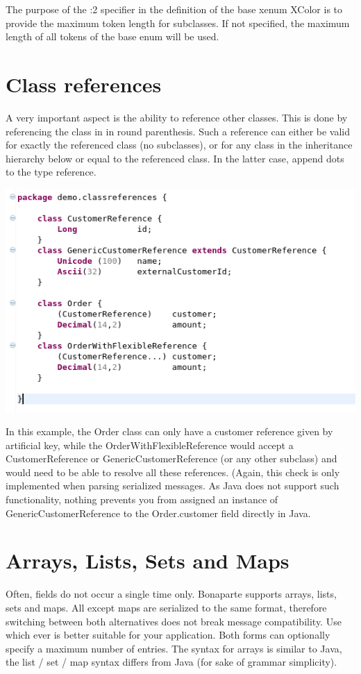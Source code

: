 \documentclass[11pt,a4paper,oneside]{article}
\begin{document}
The purpose of the {\ttfamily :2} specifier in the definition of the base xenum {\ttfamily XColor} is to provide the maximum
token length for subclasses. If not specified, the maximum length of all tokens of the base enum will be used.


\section{Class references}
A very important aspect is the ability to reference other classes. This is done by referencing the class in in round parenthesis.
Such a reference can either be valid for exactly the referenced class (no subclasses), or for any class in the inheritance hierarchy below or equal to
 the referenced class. In the latter case, append dots to the type reference.

\vspace{2mm}

\hspace{1cm}\includegraphics[scale=0.5]{images/tut1-014-ref.png}

\noindent In this example, the {\ttfamily Order} class can only have a customer reference given by artificial key, while the {\ttfamily OrderWithFlexibleReference}
would accept a {\ttfamily CustomerReference} or {\ttfamily GenericCustomerReference} (or any other subclass) and would need to be able to resolve all these
references. (Again, this check is only implemented when parsing serialized messages. As Java does not support such functionality, nothing prevents you
from assigned an instance of {\ttfamily GenericCustomerReference}  to the {\ttfamily Order.customer} field directly in Java.



\section{Arrays, Lists, Sets and Maps}
Often, fields do not occur a single time only. Bonaparte supports arrays, lists, sets and maps. All except maps are
serialized to the same format, therefore switching between both alternatives does not break message compatibility.
Use which ever is better suitable for your application.
Both forms can optionally specify a maximum number of entries. 
The syntax for arrays is similar to Java, the list / set / map syntax differs from Java (for sake of grammar simplicity).
\end{document}
